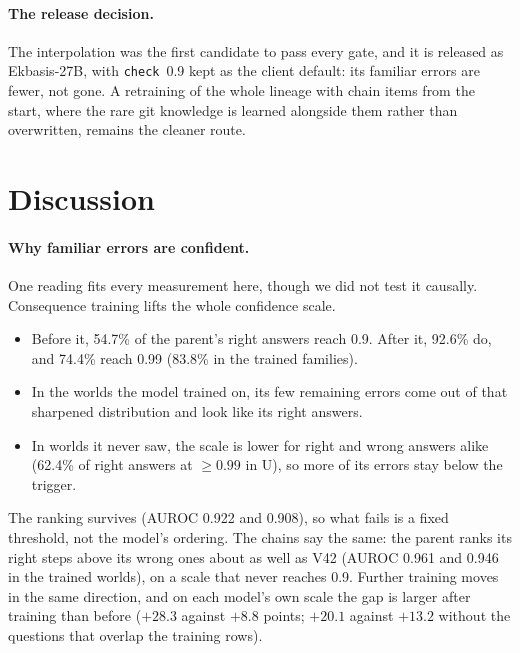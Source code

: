 \documentclass[11pt]{article}
\begin{document}
\paragraph{The release decision.} The interpolation was the first candidate to pass every gate, and it is released as
Ekbasis-27B, with \texttt{check}~0.9 kept as the client default: its familiar errors are fewer, not gone. A retraining
of the whole lineage with chain items from the start, where the rare git knowledge is learned alongside them rather than
overwritten, remains the cleaner route.

\section{Discussion}\label{sec:disc}
\paragraph{Why familiar errors are confident.} One reading fits every measurement here, though we did not test it
causally. Consequence training lifts the whole confidence scale.
\begin{itemize}
  \item Before it, 54.7\% of the parent's right answers reach 0.9. After it, 92.6\% do, and 74.4\% reach 0.99 (83.8\%
  in the trained families).
  \item In the worlds the model trained on, its few remaining errors come out of that sharpened distribution and look
  like its right answers.
  \item In worlds it never saw, the scale is lower for right and wrong answers alike (62.4\% of right answers at
  $\ge 0.99$ in U), so more of its errors stay below the trigger.
\end{itemize}
The ranking survives (AUROC 0.922 and 0.908), so what fails is a fixed threshold, not the model's ordering. The chains
say the same: the parent ranks its right steps above its wrong ones about as well as V42 (AUROC 0.961 and
0.946 in the trained worlds), on a scale that never reaches 0.9. Further
training moves in the same direction, and on each model's own scale the gap is larger after training than before
($+28.3$ against $+8.8$ points; $+20.1$ against $+13.2$ without the questions that overlap the training rows).
\end{document}
